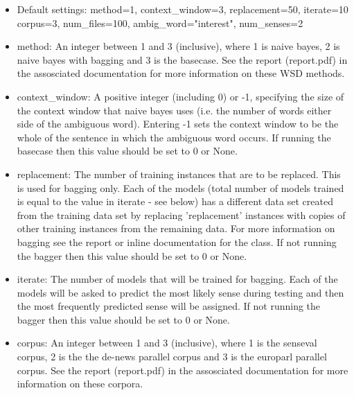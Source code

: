 \documentclass[a4wide,10pt]{article}
\begin{document}
\begin{itemize} 
\item 
Default settings:	method=1, context\_window=3, replacement=50, 
iterate=10 corpus=3, num\_files=100, ambig\_word="interest", num\_senses=2 

\item 
method:			An integer between 1 and 3 (inclusive), where 1
               is naive bayes, 2 is naive bayes with bagging and 3
                is the basecase. See the report (report.pdf) in the
                assosciated documentation for more information on these
                WSD methods.

\item 
context\_window: A positive integer (including 0) or -1, specifying the size
                of the context window that naive bayes uses (i.e. the
                number of words either side of the ambiguous word). Entering
                -1 sets the context window to be the whole of the sentence
                in which the ambiguous word occurs. If running the basecase
                then this value should be set to 0 or None.

\item 
replacement:    The number of training instances that are to be replaced.
                This is used for bagging only.  Each of the models (total
                number of models trained is equal to the value in iterate -
                see below) has a different data set created from the training
                data set by replacing 'replacement' instances with copies of
                other training instances from the remaining data.  For
                more information on bagging see the report or inline
                documentation for the class.  If not running the bagger
                then this value should be set to 0 or None.

\item 
iterate:        The number of models that will be trained for bagging.
                Each of the models will be asked to predict the most likely
                sense during testing and then the most frequently predicted
                sense will be assigned.  If not running the bagger then this
                value should be set to 0 or None.

\item 
corpus:         An integer between 1 and 3 (inclusive), where 1 is the
                senseval corpus, 2 is the the de-news parallel corpus and 3
                is the europarl parallel corpus. See the report (report.pdf)
                in the assosciated documentation for more information on
                these corpora.


\end{itemize}
\end{document}
